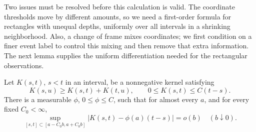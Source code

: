 Two issues must be resolved before this calculation is valid.  The
coordinate thresholds move by different amounts, so we need a first-order
formula for rectangles with unequal depths, uniformly over all intervals
in a shrinking neighborhood.  Also, a change of frame mixes coordinates;
we first condition on a finer event label to control this mixing and then
remove that extra information.  The next lemma supplies the uniform
differentiation needed for the rectangular observations.

\begin{lemma}
\label{lem:gap-density}
Let $K(s,t)$, $s<t$ in an interval, be a nonnegative kernel satisfying
\[
 K(s,u)\ge K(s,t)+K(t,u),\qquad
 0\le K(s,t)\le C(t-s).
\]
There is a measurable $\phi$, $0\le\phi\le C$, such that for almost
every $a$, and for every fixed $C_0<\infty$,
\begin{equation}
 \sup_{[s,t]\subset[a-C_0b,a+C_0b]}
 \bigl|K(s,t)-\phi(a)(t-s)\bigr|=o(b)
       \quad(b\downarrow0).
 \label{eq:gap-uniform-density}
\end{equation}
\end{lemma}

